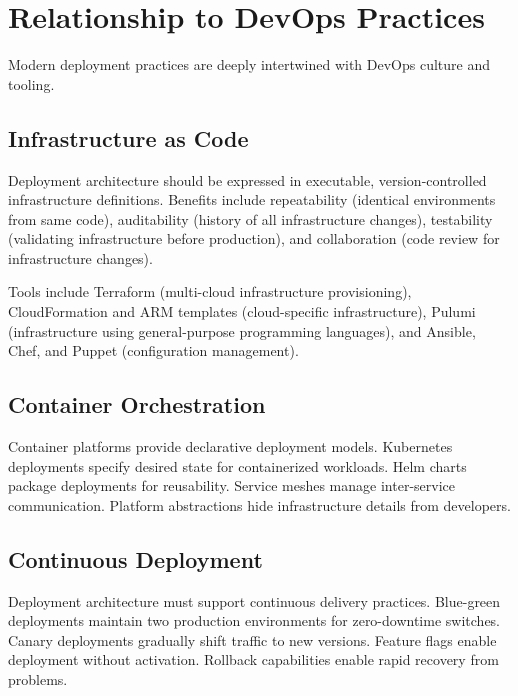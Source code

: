 \documentclass[11pt]{article}
\begin{document}
\section{Relationship to DevOps Practices}

Modern deployment practices are deeply intertwined with DevOps culture and tooling.

\subsection{Infrastructure as Code}

Deployment architecture should be expressed in executable, version-controlled infrastructure definitions. Benefits include repeatability (identical environments from same code), auditability (history of all infrastructure changes), testability (validating infrastructure before production), and collaboration (code review for infrastructure changes).

Tools include Terraform (multi-cloud infrastructure provisioning), CloudFormation and ARM templates (cloud-specific infrastructure), Pulumi (infrastructure using general-purpose programming languages), and Ansible, Chef, and Puppet (configuration management).

\subsection{Container Orchestration}

Container platforms provide declarative deployment models. Kubernetes deployments specify desired state for containerized workloads. Helm charts package deployments for reusability. Service meshes manage inter-service communication. Platform abstractions hide infrastructure details from developers.

\subsection{Continuous Deployment}

Deployment architecture must support continuous delivery practices. Blue-green deployments maintain two production environments for zero-downtime switches. Canary deployments gradually shift traffic to new versions. Feature flags enable deployment without activation. Rollback capabilities enable rapid recovery from problems.
\end{document}
